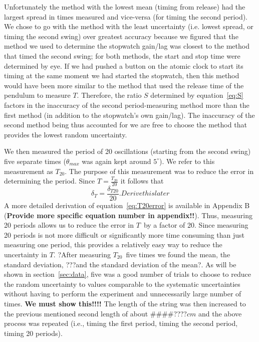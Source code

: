 \documentclass[iop]{emulateapj}
\def\T{$T$}
\def\Ttwen{$T_{20}$}
\def\fillin{\#\#\#\#????}
\def\deg{^{\circ}}
\begin{document}
Unfortunately the method with the lowest 
mean (timing from release) had the largest spread in times measured and 
vice-versa (for timing the second period). We chose to go 
with the method with the least uncertainty (i.e. lowest spread, or timing the 
second swing) over greatest accuracy because we figured that the method we 
used to determine the stopwatch gain/lag was closest to the method that timed 
the second swing; for both methods, the start and stop time were determined by 
eye.  If we had pushed a button on the atomic clock to start its timing at the 
same moment we had started the stopwatch, then this method would have been 
more similar to the method that used the release time of the pendulum to 
measure \T.  Therefore, the ratio $S$ determined by equation~\ref{eq:S} 
factors in the inaccuracy of the second period-measuring method more 
than the first method (in addition to the stopwatch's own gain/lag). The 
inaccuracy of the second method being thus accounted for we are free to choose 
the method that provides the lowest random uncertainty. 

We then measured the period of 20 oscillations (starting from the second 
swing) five separate times ($\theta_{max}$ was again kept around $5\deg$). 
We refer to this measurement as $T_{20}$. The purpose of this 
measurement was to reduce the error in determining the period.  Since 
$T=\frac{T_{20}}{20}$ it follows that
\begin{equation}
\label{eq:T20error}
\delta_T = \frac{\delta_{T20}}{20}.  Derive this later
\end{equation}
A more detailed derivation of equation~\ref{eq:T20error} is available in 
Appendix B ({\bf Provide more specific equation number in appendix!!}).
Thus, measuring 20 periods allows us to reduce the error in \T\ by a factor of 
20.  Since measuring 20 periods is not more difficult or significantly more 
time consuming than just measuring one period, this provides a relatively easy 
way to reduce the uncertainty in \T.  ?After measuring \Ttwen\ five times we 
found the mean, the standard deviation, ???and the standard deviation of the 
mean?.  As will be shown in section~\ref{sec:data}, five was a good number of trials to 
choose to reduce the random uncertainty to values comparable to the systematic 
uncertainties without having to perform the experiment and unnecessarily large 
number of times. {\bf We must show this!!!!}  The length of the string was 
then increased to the previous mentioned second length of 
about \fillin $cm$ and the above process was repeated (i.e., 
timing the first period, timing the second period, timing 20 periods).
\end{document}
